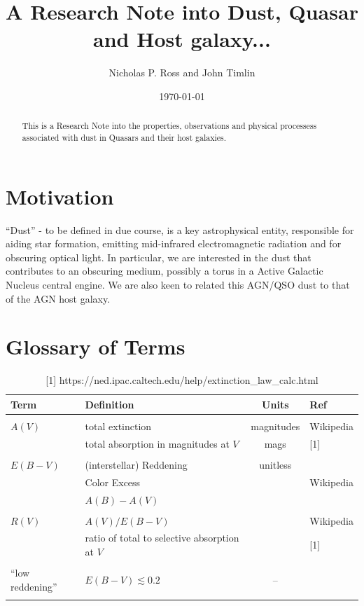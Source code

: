 \documentclass[11pt]{article}
\begin{document}
\title{A Research Note into Dust, Quasar and Host galaxy... }
\author{Nicholas P. Ross and John Timlin}
\date{\today}
\maketitle


\begin{abstract}
This is a Research Note into the properties, observations and physical 
processess associated with dust in Quasars and their host galaxies.
\end{abstract}

\section{Motivation}
``Dust'' - to be defined in due course, is a key astrophysical entity, 
responsible for aiding star formation, emitting mid-infrared electromagnetic
radiation and for obscuring optical light. In particular, we are interested in 
the dust that contributes to an obscuring medium, possibly a torus in a 
Active Galactic Nucleus central engine. We are also keen to related this 
AGN/QSO dust to that of the AGN host galaxy. 

\section{Glossary of Terms}
\begin{table}[h]
\begin{center}
\begin{tabular}{llcl}
\hline
\hline
Term                 & Definition                       &Units & Ref \\
\hline
                         & & & \\
$A(V)$               &  total extinction & magnitudes & Wikipedia\\
                         & total absorption in magnitudes at $V$ & mags & [1] \\
                         & & & \\
$E(B-V)$            & (interstellar) Reddening  & unitless & \\
                          & Color Excess                  &   & Wikipedia \\
                          & $A(B)-A(V)$                    &      &  \\
                          & & & \\
$R(V)$                 & $A(V)/E(B-V)$ &                     & Wikipedia\\
                           & ratio of total to selective absorption at $V$ &  & [1] \\
                           & & & \\
``low reddening''    & $E(B-V)\lesssim0.2$      & -- & \citet{Ross09} \\
                         & & & \\
\hline
\hline
\end{tabular}
\caption{[1] https://ned.ipac.caltech.edu/help/extinction\_law\_calc.html}
\end{center}
\end{table}
\end{document}
